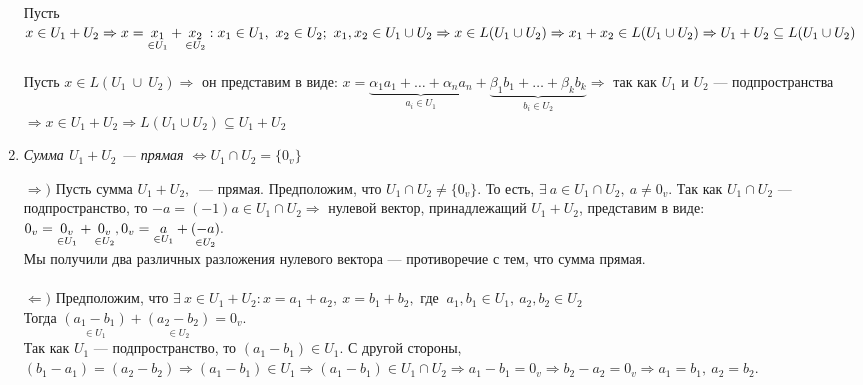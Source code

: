 \begin{enumerate}
	\begin{Proof}
		Пусть $x\in U_1+ U_2\Rightarrow x=\underset{\in U_1}{x_1} + \underset{\in U_2}{x_2}:x_1 \in U_1,\ x_2\in U_2;\ x_1, x_2 \in U_1 \cup U_2\Rightarrow\\ x \in L(U_1 \cup U_2)\Rightarrow x_1 + x_2 \in L(U_1\cup U_2)\Rightarrow U_1+ U_2\subseteq L(U_1 \cup U_2)$\\\\
		Пусть $x\in L(U_1\ \cup\  U_2)\Rightarrow$ он представим в виде: $x = \underbrace{\alpha_1 a_1 + \ldots + \alpha_n a_n}_{a_i\in U_1} + \underbrace{\beta_1 b_1 + \ldots + \beta_k b_k}_{b_i\in U_2}\Rightarrow$ так как $U_1$ и $U_2$ --- подпространства $\Rightarrow x \in U_1 + U_2 \Rightarrow L(U_1\cup U_2) \subseteq U_1 + U_2$
	\end{Proof}
	\item \textit{Сумма $U_1 + U_2$ --- прямая $\Longleftrightarrow U_1\cap U_2 = \{0_v\}$}
	\begin{Proof}
		$\Rightarrow )$ Пусть сумма $ U_1 + U_2,\ $ --- прямая. Предположим, что $U_1\cap U_2 \ne \{0_v\}$. То есть, $\exists\  a\in U_1\cap U_2,\ a\ne 0_v$. Так как $U_1 \cap U_2$ --- подпространство, то $-a = (-1) a\in U_1 \cap U_2\Rightarrow$ нулевой вектор, принадлежащий $U_1 + U_2$, представим в виде:\\
		$0_v = \underset{\in U_1}{0_v} + \underset{\in U_2}{0_v}, \\ 0_v = \underset{\in U_1}{a} + \underset{\in U_2}{(-a)}.$\\
		Мы получили два различных разложения нулевого вектора --- противоречие с тем, что сумма прямая.\\\\
		$\Leftarrow )$ Предположим, что $\exists \ x\in U_1 + U_2: x=a_1 + a_2, \ x = b_1 + b_2,$ где $\ a_1,b_1 \in U_1, \ a_2,b_2 \in U_2$\\
		Тогда $\underset{\in U_1}{(a_1 - b_1)} + \underset{\in U_2}{(a_2 - b_2)} = 0_v$.\\
		Так как $U_1$ --- подпространство, то $(a_1 - b_1)\in U_1$. С другой стороны, $(b_1 - a_1) = (a_2 - b_2)\Rightarrow (a_1 - b_1)\in U_1\Rightarrow (a_1 - b_1) \in U_1 \cap U_2 \Rightarrow a_1 - b_1 = 0_v\Rightarrow b_2 - a_2 = 0_v\Rightarrow a_1 = b_1,\ a_2 = b_2$.
	\end{Proof}
\end{enumerate}
